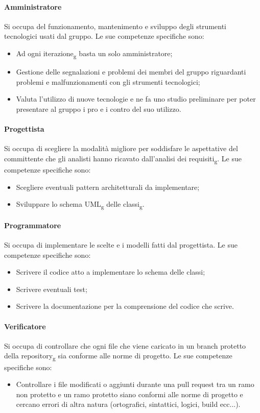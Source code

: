 \paragraph{Amministratore}
Si occupa del funzionamento, mantenimento e sviluppo degli strumenti tecnologici usati dal gruppo. Le sue competenze specifiche sono:
\begin{itemize}
	\item Ad ogni iterazione\textsubscript{g} basta un solo amministratore;
	\item Gestione delle segnalazioni e problemi dei membri del gruppo riguardanti problemi e malfunzionamenti con gli strumenti tecnologici;
	\item Valuta l'utilizzo di nuove tecnologie e ne fa uno studio preliminare per poter presentare al gruppo i pro e i contro del suo utilizzo.
\end{itemize}

\paragraph{Progettista}
Si occupa di scegliere la modalità migliore per soddisfare le aspettative del committente che gli analisti hanno ricavato dall'analisi dei requisiti\textsubscript{g}. Le sue competenze specifiche sono:
\begin{itemize}
	\item Scegliere eventuali pattern architetturali da implementare;
	\item Sviluppare lo schema UML\textsubscript{g} delle classi\textsubscript{g}.
\end{itemize}

\paragraph{Programmatore}
Si occupa di implementare le scelte e i modelli fatti dal progettista. Le sue competenze specifiche sono:
\begin{itemize}
	\item Scrivere il codice atto a implementare lo schema delle classi;
	\item Scrivere eventuali test;
	\item Scrivere la documentazione per la comprensione del codice che scrive.
\end{itemize}

\paragraph{Verificatore}
Si occupa di controllare che ogni file che viene caricato in un branch protetto della repository\textsubscript{g} sia conforme alle norme di progetto. Le sue competenze specifiche sono:
\begin{itemize}
	\item Controllare i file modificati o aggiunti durante una pull request tra un ramo non protetto e un ramo protetto siano conformi alle norme di progetto e cercano errori di altra natura (ortografici, sintattici, logici, build ecc...).
\end{itemize}
